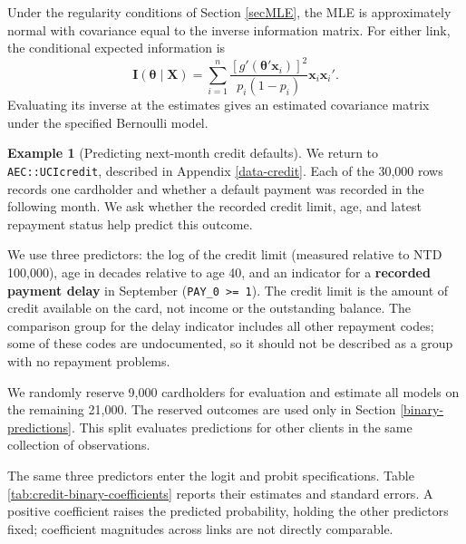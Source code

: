 \documentclass[
  11pt,
]{book}
\theoremstyle{definition}
\theoremstyle{definition}
\newtheorem{example}{Example}[chapter]
\theoremstyle{definition}
\theoremstyle{definition}
\theoremstyle{remark}
\begin{document}
Under the regularity conditions of Section \ref{secMLE}, the MLE is approximately normal with covariance equal to the inverse information matrix. For either link, the conditional expected information is
\[
\mathbf{I}(\boldsymbol\theta\mid\mathbf{X})=
\sum_{i=1}^n\frac{[g'(\boldsymbol\theta'\mathbf{x}_i)]^2}{p_i(1-p_i)}
\mathbf{x}_i\mathbf{x}_i'.
\]
Evaluating its inverse at the estimates gives an estimated covariance matrix under the specified Bernoulli model.

\begin{example}[Predicting next-month credit defaults]
\protect\hypertarget{exm:creditProbit}{}\label{exm:creditProbit}We return to \texttt{AEC::UCIcredit}, described in Appendix \ref{data-credit}. Each of the 30,000 rows records one cardholder and whether a default payment was recorded in the following month. We ask whether the recorded credit limit, age, and latest repayment status help predict this outcome.

We use three predictors: the log of the credit limit (measured relative to NTD 100,000), age in decades relative to age 40, and an indicator for a \textbf{recorded payment delay} in September (\texttt{PAY\_0\ \textgreater{}=\ 1}). The credit limit is the amount of credit available on the card, not income or the outstanding balance. The comparison group for the delay indicator includes all other repayment codes; some of these codes are undocumented, so it should not be described as a group with no repayment problems.

We randomly reserve 9,000 cardholders for evaluation and estimate all models on the remaining 21,000. The reserved outcomes are used only in Section \ref{binary-predictions}. This split evaluates predictions for other clients in the same collection of observations.

The same three predictors enter the logit and probit specifications. Table \ref{tab:credit-binary-coefficients} reports their estimates and standard errors. A positive coefficient raises the predicted probability, holding the other predictors fixed; coefficient magnitudes across links are not directly comparable.

\begin{table}[H]
\centering
\caption{\label{tab:credit-binary-coefficients}Credit-default models: estimates and standard errors (21,000 training observations).}
\centering
{}
\end{table}


\end{example}
\end{document}
